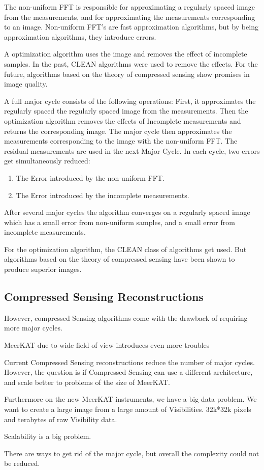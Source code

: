 The non-uniform FFT is responsible for approximating a regularly spaced image from the measurements, and for approximating the measurements corresponding to an image. Non-uniform FFT's are fast approximation algorithms, but by being approximation algorithms, they introduce errors. 

A optimization algorithm uses the image and removes the effect of incomplete samples. In the past, CLEAN algorithms were used to remove the effects. For the future, algorithms based on the theory of compressed sensing show promises in image quality.

A full major cycle consists of the following operations: First, it approximates the regularly spaced the regularly spaced image from the measurements. Then the optimization algorithm removes the effects of Incomplete measurements and returns the corresponding image. The major cycle then approximates the measurements corresponding to the image with the non-uniform FFT. The residual measurements are used in the next Major Cycle. In each cycle, two errors get simultaneously reduced:

\begin{enumerate}
	\item The Error introduced by the non-uniform FFT.
	\item The Error introduced by the incomplete measurements.
\end{enumerate}

After several major cycles the algorithm converges on a regularly spaced image which has a small error from non-uniform samples, and a small error from incomplete measurements.

For the optimization algorithm, the CLEAN class of algorithms get used. But algorithms based on the theory of compressed sensing have been shown to produce superior images.


\subsection{Compressed Sensing Reconstructions}
 However, compressed Sensing algorithms come with the drawback of requiring more major cycles.

MeerKAT due to wide field of view introduces even more troubles

Current Compressed Sensing reconstructions reduce the number of major cycles. However, the question is if Compressed Sensing can use a different architecture, and scale better to problems of the size of MeerKAT.

Furthermore on the new MeerKAT instruments, we have a big data problem. We want to create a large image from a large amount of Visibilities. 32k*32k pixels and terabytes of raw Visibility data. 

Scalability is a big problem.

There are ways to get rid of the major cycle, but overall the complexity could not be reduced.









